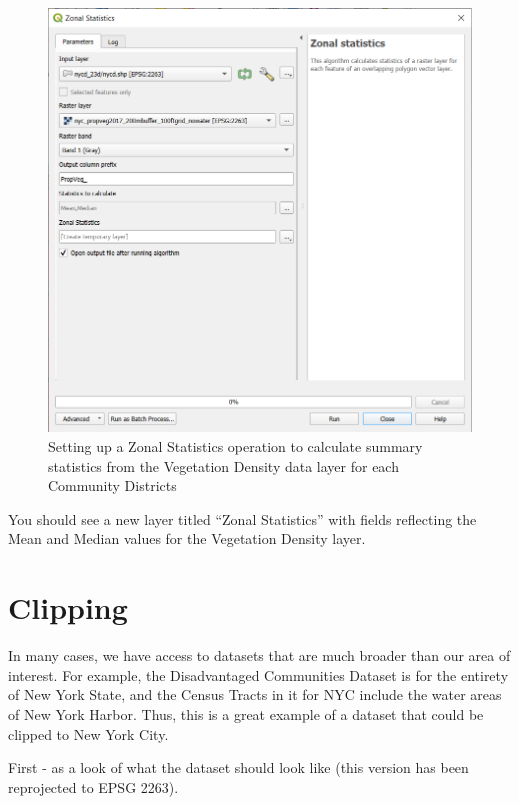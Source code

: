 \documentclass[
  letterpaper,
  DIV=11,
  numbers=noendperiod]{scrreprt}
\begin{document}
\begin{figure}

{\centering \includegraphics{./images/ZonalStatsSetup.png}

}

\caption{Setting up a Zonal Statistics operation to calculate summary
statistics from the Vegetation Density data layer for each Community
Districts}

\end{figure}

You should see a new layer titled ``Zonal Statistics'' with fields
reflecting the Mean and Median values for the Vegetation Density layer.

\hypertarget{clipping}{%
\section{Clipping}\label{clipping}}

In many cases, we have access to datasets that are much broader than our
area of interest. For example, the Disadvantaged Communities Dataset is
for the entirety of New York State, and the Census Tracts in it for NYC
include the water areas of New York Harbor. Thus, this is a great
example of a dataset that could be clipped to New York City.

First - as a look of what the dataset should look like (this version has
been reprojected to EPSG 2263).
\end{document}
